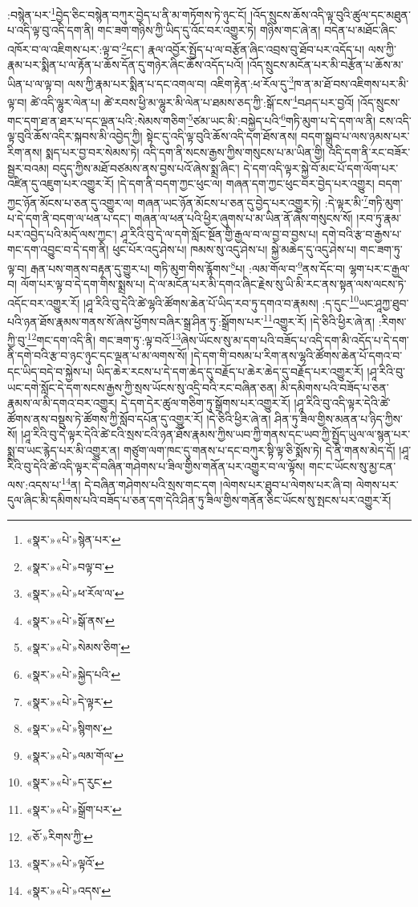 :བསྙེན་པར་\footnote{«སྣར་»«པེ་»སྙེན་པར་}བྱེད་ཅིང་བསྙེན་བཀུར་བྱེད་པ་ནི་མ་གཏོགས་ཏེ་ཉུང་ངོ། །འོད་སྲུངས་ཆོས་འདི་ལྟ་བུའི་ཚུལ་དང་མཐུན་པ་འདི་ལྟ་བུ་འདི་དག་ནི། གང་ཟག་གཉིས་ཀྱི་ཡིད་དུ་འོང་བར་འགྱུར་ཏེ། གཉིས་གང་ཞེ་ན། བདེན་པ་མཐོང་ཞིང་འཁོར་བ་ལ་འཇིགས་པར་:ལྟ་བ་\footnote{«སྣར་»«པེ་»བལྟ་བ་}དང་། རྣལ་འབྱོར་སྤྱོད་པ་ལ་བརྩོན་ཞིང་འབྲས་བུ་ཐོབ་པར་འདོད་པ། ལས་ཀྱི་རྣམ་པར་སྨིན་པ་ལ་རྟོན་པ་ཆོས་དོན་དུ་གཉེར་ཞིང་ཆོས་འདོད་པའོ། །འོད་སྲུངས་མངོན་པར་མི་བརྩོན་པ་ཆོས་མ་ཡིན་པ་ལ་ལྟ་བ། ལས་ཀྱི་རྣམ་པར་སྨིན་པ་དང་འགལ་བ། འཇིག་རྟེན་:ཕ་རོལ་དུ་\footnote{«སྣར་»«པེ་»ཕ་རོལ་ལ་}ཁ་ན་མ་ཐོ་བས་འཇིགས་པར་མི་ལྟ་བ། ཚེ་འདི་ལྷུར་ལེན་པ། ཚེ་རབས་ཕྱི་མ་ལྷུར་མི་ལེན་པ་ཐམས་ཅད་ཀྱི་:སྒོ་ངས་\footnote{«སྣར་»«པེ་»སྒོ་ནས་}བཤད་པར་བྱའོ། །འོད་སྲུངས་གང་དག་ཐ་ན་ཐར་པ་དང་ལྡན་པའི་:སེམས་གཅིག་\footnote{«སྣར་»«པེ་»སེམས་ཅིག་}ཙམ་ཡང་མི་:བསྐྱེད་པའི་\footnote{«སྣར་»«པེ་»སྐྱེད་པའི་}གཏི་མུག་པ་དེ་དག་ལ་ནི། ངས་འདི་ལྟ་བུའི་ཆོས་འདིར་སྐབས་མི་འབྱེད་ཀྱི། སྟེང་དུ་འདི་ལྟ་བུའི་ཆོས་འདི་དག་ཐོས་ནས། བདག་སྒྲུབ་པ་ལས་ཉམས་པར་རིག་ནས། སྨད་པར་བྱ་བར་སེམས་ཏེ། འདི་དག་ནི་སངས་རྒྱས་ཀྱིས་གསུངས་པ་མ་ཡིན་གྱི། འདི་དག་ནི་རང་བཟོར་སྦྱར་བའམ། བདུད་ཀྱིས་མཐོ་བཙམས་ནས་བྱས་པའོ་ཞེས་སྨྲ་ཞིང་། དེ་དག་འདི་ལྟར་སྐྱེ་བོ་མང་པོ་དག་ལོག་པར་འཛིན་དུ་འཇུག་པར་འགྱུར་རོ། །དེ་དག་ནི་བདག་ཀྱང་ཕུང་ལ། གཞན་དག་ཀྱང་ཕུང་བར་བྱེད་པར་འགྱུར། བདག་ཀྱང་ཉོན་མོངས་པ་ཅན་དུ་འགྱུར་ལ། གཞན་ཡང་ཉོན་མོངས་པ་ཅན་དུ་བྱེད་པར་འགྱུར་ཏེ། :དེ་ལྟར་མི་\footnote{«སྣར་»«པེ་»དེ་ལྟར་}གཏི་མུག་པ་དེ་དག་ནི་བདག་ལ་ཕན་པ་དང་། གཞན་ལ་ཕན་པའི་ཕྱིར་ཞུགས་པ་མ་ཡིན་ནོ་ཞེས་གསུངས་སོ། །རབ་ཏུ་རྣམ་པར་འབྱེད་པའི་མདོ་ལས་ཀྱང་། ཤཱ་རིའི་བུ་དེ་ལ་དགེ་སློང་སྔོན་གྱི་རྒྱལ་བ་ལ་བྱ་བ་བྱས་པ། དགེ་བའི་རྩ་བ་རྒྱས་པ་གང་དག་འབྱུང་བ་དེ་དག་ནི། ཕུང་པོར་འདུ་ཤེས་པ། ཁམས་སུ་འདུ་ཤེས་པ། སྐྱེ་མཆེད་དུ་འདུ་ཤེས་པ། གང་ཟག་ཏུ་ལྟ་བ། རྒན་པས་གནས་བརྟན་དུ་གྱུར་པ། གཏི་མུག་གིས་རྙོགས་\footnote{«སྣར་»«པེ་»སྙིགས་}པ། :ལམ་གོལ་བ་\footnote{«སྣར་»«པེ་»ལམ་གོལ་}ནས་དོང་བ། ལྷག་པར་ང་རྒྱལ་བ། ལོག་པར་ལྟ་བ་དེ་དག་གིས་སྨྲས་པ། དེ་ལ་མངོན་པར་མི་དགའ་ཞིང་རྗེས་སུ་ཡི་མི་རང་ནས་སྟན་ལས་ལངས་ཏེ་འདོང་བར་འགྱུར་རོ། །ཤཱ་རིའི་བུ་དེའི་ཚེ་ལྷའི་ཚོགས་ཆེན་པོ་ཡིད་རབ་ཏུ་དགའ་བ་རྣམས། :ད་དུང་\footnote{«སྣར་»«པེ་»ད་རུང་}ཡང་ཤཱཀྱ་ཐུབ་པའི་ཉན་ཐོས་རྣམས་གནས་སོ་ཞེས་ཕྱོགས་བཞིར་སྒྲ་ཤིན་ཏུ་:སྒྲོགས་པར་\footnote{«སྣར་»«པེ་»སྒྲོག་པར་}འགྱུར་རོ། །དེ་ཅིའི་ཕྱིར་ཞེ་ན། :རིགས་ཀྱི་བུ་\footnote{«ཅོ་»རིགས་ཀྱི་}གང་དག་འདི་ནི། གང་ཟག་ཏུ་:ལྟ་བའོ་\footnote{«སྣར་»«པེ་»ལྟའོ་}ཞེས་ཡོངས་སུ་མ་དག་པའི་བཟོད་པ་འདི་དག་མི་འདོད་པ་དེ་དག་ནི་དགེ་བའི་རྩ་བ་ཉང་ཉུང་དང་ལྡན་པ་མ་ལགས་སོ། །དེ་དག་གི་བསམ་པ་རིག་ནས་ལྷའི་ཚོགས་ཆེན་པོ་དགའ་བ་དང་ཡིད་བདེ་བ་སྐྱེས་པ། ཡིད་ཆེར་རངས་པ་དེ་དག་ཆེད་དུ་བརྗོད་པ་ཆེར་ཆེད་དུ་བརྗོད་པར་འགྱུར་རོ། །ཤཱ་རིའི་བུ་ཡང་དགེ་སློང་དེ་དག་སངས་རྒྱས་ཀྱི་སྲས་ཡོངས་སུ་འདྲི་བའི་རང་བཞིན་ཅན། མི་དམིགས་པའི་བཟོད་པ་ཅན་རྣམས་ལ་མི་དགའ་བར་འགྱུར། དེ་དག་དེར་ཚུལ་གཅིག་ཏུ་སྒྲོགས་པར་འགྱུར་རོ། །ཤཱ་རིའི་བུ་འདི་ལྟར་དེའི་ཚེ་ཚོགས་ནས་བསྡུས་ཏེ་ཚོགས་ཀྱི་སློབ་དཔོན་དུ་འགྱུར་རོ། །དེ་ཅིའི་ཕྱིར་ཞེ་ན། ཤིན་ཏུ་ཟིལ་གྱིས་མནན་པ་ཉིད་ཀྱིས་སོ། །ཤཱ་རིའི་བུ་དེ་ལྟར་དེའི་ཚེ་ངའི་སྲས་ངའི་ཉན་ཐོས་རྣམས་ཀྱིས་ཡབ་ཀྱི་གནས་དང་ཡབ་ཀྱི་སྤྱོད་ཡུལ་ལ་སྙན་པར་སྨྲ་བ་ཡང་རྙེད་པར་མི་འགྱུར་ན། གཙུག་ལག་ཁང་དུ་གནས་པ་དང་བཀུར་སྟི་ལྟ་ཅི་སྨོས་ཏེ། དེ་ནི་གནས་མེད་དོ། །ཤཱ་རིའི་བུ་དེའི་ཚེ་འདི་ལྟར་དེ་བཞིན་གཤེགས་པ་ཟིལ་གྱིས་གནོན་པར་འགྱུར་བ་ལ་ལྟོས། གང་ང་ཡོངས་སུ་མྱ་ངན་ལས་:འདས་པ་\footnote{«སྣར་»«པེ་»འདས་}ན། དེ་བཞིན་གཤེགས་པའི་སྲས་གང་དག །ལེགས་པར་ཐུབ་པ་ལེགས་པར་ཞི་བ། ལེགས་པར་དུལ་ཞིང་མི་དམིགས་པའི་བཟོད་པ་ཅན་དག་དེའི་ཤིན་ཏུ་ཟིལ་གྱིས་གནོན་ཅིང་ཡོངས་སུ་སྤངས་པར་འགྱུར་རོ། 
